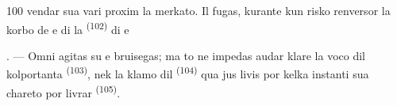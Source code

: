 \begin{VUpage}[102]{100}
\VUcontinue
vendar sua vari proxim la merkato. Il fugas,\nl
kurante kun risko renversor la korbo de \nl
{} e  di la  \textsuperscript{(102)} di \nl
e 

. --- Omni agitas su e bruisegas; ma to\nl
ne impedas audar klare la voco dil kolportanta\nl
{} \textsuperscript{(103)}, nek la klamo dil  \textsuperscript{(104)}\nl
qua jus livis por kelka instanti sua chareto por\nl
livrar  \textsuperscript{(105)}.

\VUsaut{6.0mm}
\VUfilet{22mm}
\end{VUpage}
